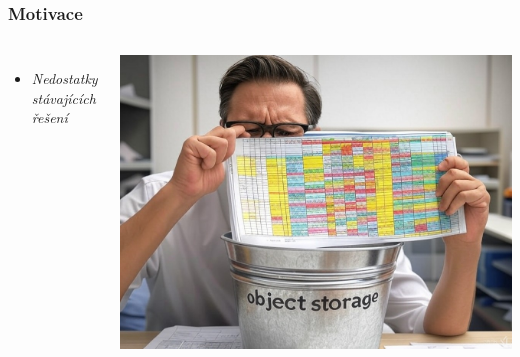 \begin{frame}
  \frametitle{Motivace}
  \begin{columns}
    \begin{itemize}
        \item \emph{Nedostatky stávajících řešení}
        \phantom{\item Neexistence univerzálního řešení}
        \phantom{\item Neexistence triviálně použitelného řešení}
    \end{itemize}
     
    \includegraphics[width=\textwidth]{img/spreadsheet-doesnt-fit.jpg}
  \end{columns}
\end{frame}


